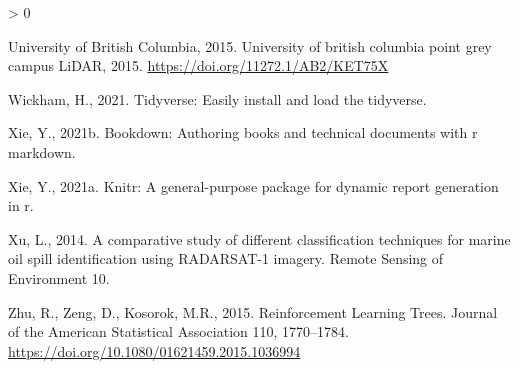 \documentclass[
]{article}
\newlength{\cslhangindent}
\newenvironment{CSLReferences}[2] %
 {%
  \setlength{\parindent}{0pt}
  \ifodd #1 \everypar{\setlength{\hangindent}{\cslhangindent}}\ignorespaces\fi
  \ifnum #2 > 0
  \setlength{\parskip}{#2\baselineskip}
  \fi
 }%
 {}
\begin{document}
\begin{CSLReferences}{1}{0}
\leavevmode\hypertarget{ref-AB2ux2fKET75X2015a}{}%
University of British Columbia, 2015. University of british columbia point grey campus LiDAR, 2015. \url{https://doi.org/11272.1/AB2/KET75X}

\leavevmode\hypertarget{ref-R-tidyverse}{}%
Wickham, H., 2021. Tidyverse: Easily install and load the tidyverse.

\leavevmode\hypertarget{ref-R-bookdown}{}%
Xie, Y., 2021b. Bookdown: Authoring books and technical documents with r markdown.

\leavevmode\hypertarget{ref-R-knitr}{}%
Xie, Y., 2021a. Knitr: A general-purpose package for dynamic report generation in r.

\leavevmode\hypertarget{ref-xu2014}{}%
Xu, L., 2014. A comparative study of different classification techniques for marine oil spill identification using RADARSAT-1 imagery. Remote Sensing of Environment 10.

\leavevmode\hypertarget{ref-zhu2015}{}%
Zhu, R., Zeng, D., Kosorok, M.R., 2015. Reinforcement Learning Trees. Journal of the American Statistical Association 110, 1770--1784. \url{https://doi.org/10.1080/01621459.2015.1036994}

\end{CSLReferences}
\end{document}
